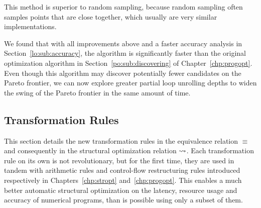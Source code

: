 This method is superior to random sampling, because random sampling often
samples points that are close together, which usually are very similar
implementations.

We found that with all improvements above and a faster accuracy analysis in
Section~\ref{lo:sub:accuracy}, the algorithm is significantly faster than
the original optimization algorithm in Section~\ref{po:sub:discovering} of
Chapter~\ref{chp:progopt}.  Even though this algorithm may discover potentially
fewer candidates on the Pareto frontier, we can now explore greater partial
loop unrolling depths to widen the swing of the Pareto frontier in the same
amount of time.



\subsection{Transformation Rules}
\label{lo:sub:transformation_rules}

This section details the new transformation rules in the equivalence relation
$\equiv$ and consequently in the structural optimization relation $\mathbin{\rightsquigarrow}$.
Each transformation rule on its own is not revolutionary, but for the
first time, they are used in tandem with arithmetic rules and control-flow
restructuring rules introduced respectively in Chapters~\ref{chp:stropt}
and~\ref{chp:progopt}.  This enables a much better automatic structural
optimization on the latency, resource usage and accuracy of numerical programs,
than is possible using only a subset of them.

